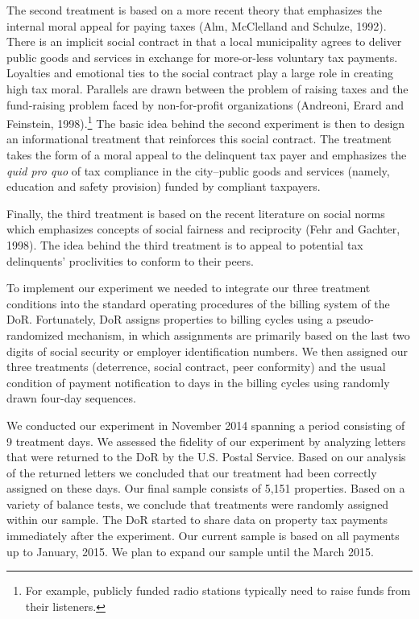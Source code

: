\documentclass[12pt,titlepage]{article}
\begin{document}
The second treatment is based on a more recent theory that emphasizes
the internal moral appeal for paying taxes (Alm, McClelland and Schulze, 1992). 
There is an implicit social contract in that a local municipality agrees to deliver
public goods and services in exchange for more-or-less voluntary tax
payments.  Loyalties and emotional ties to the social contract play a large role in creating
high tax moral. Parallels are drawn between the problem of raising
taxes and the fund-raising problem faced by non-for-profit
organizations (Andreoni, Erard and Feinstein, 1998).\footnote{For example, publicly funded radio stations
  typically need to raise funds from their listeners.} The basic idea
behind the second experiment is then to design an informational
treatment that reinforces this social contract. The treatment takes
the form of a moral appeal to the delinquent tax payer and emphasizes
the \textit{quid pro quo} of tax compliance in the city--public goods
and services (namely, education and safety provision) funded by
compliant taxpayers. 

Finally, the third treatment is based on the recent literature on
social norms which emphasizes concepts of social fairness and
reciprocity (Fehr and Gachter, 1998). The idea behind the third treatment is to appeal to
potential tax delinquents' proclivities to conform to their peers.

To implement our experiment we needed to integrate our three treatment conditions into
the standard operating procedures of the billing system of
the DoR. Fortunately, DoR assigns properties to billing cycles
using a pseudo-randomized mechanism, in which assignments are primarily
based on the last two digits of social security or  employer
identification numbers.  We then assigned our three treatments (deterrence,
social contract, peer conformity) and the usual condition
of payment notification to days in the billing cycles using randomly drawn four-day sequences.

We conducted our experiment in November 2014 spanning a period 
consisting of 9 treatment days.  We assessed the fidelity of our
experiment by analyzing letters that were returned to the DoR by the
U.S. Postal Service. Based on our analysis of the returned letters we
concluded that our treatment had been correctly assigned on these
days. Our final sample consists of 5,151
properties. Based on a variety of balance tests, we conclude
that treatments were randomly assigned within our sample. The DoR
started to share data on property tax payments immediately after the
experiment. Our current sample is based on all payments up to January,
2015. We plan to expand our sample until the March 2015.
\end{document}
